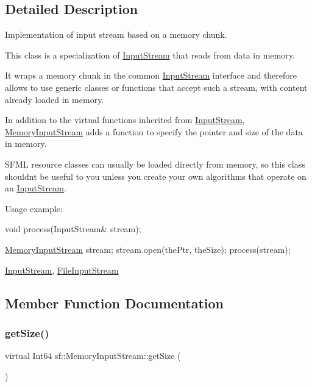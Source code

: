 \subsection{Detailed Description}
Implementation of input stream based on a memory chunk. 

This class is a specialization of \hyperlink{classsf_1_1_input_stream}{Input\+Stream} that reads from data in memory.

It wraps a memory chunk in the common \hyperlink{classsf_1_1_input_stream}{Input\+Stream} interface and therefore allows to use generic classes or functions that accept such a stream, with content already loaded in memory.

In addition to the virtual functions inherited from \hyperlink{classsf_1_1_input_stream}{Input\+Stream}, \hyperlink{classsf_1_1_memory_input_stream}{Memory\+Input\+Stream} adds a function to specify the pointer and size of the data in memory.

S\+F\+ML resource classes can usually be loaded directly from memory, so this class shouldn\textquotesingle{}t be useful to you unless you create your own algorithms that operate on an \hyperlink{classsf_1_1_input_stream}{Input\+Stream}.

Usage example\+: 
\begin{DoxyCode}
\textcolor{keywordtype}{void} process(InputStream& stream);

\hyperlink{classsf_1_1_memory_input_stream_a2d78851a69a8956a79872be41bcdfe0e}{MemoryInputStream} stream;
stream.open(thePtr, theSize);
process(stream);
\end{DoxyCode}


\hyperlink{classsf_1_1_input_stream}{Input\+Stream}, \hyperlink{classsf_1_1_file_input_stream}{File\+Input\+Stream} 

\subsection{Member Function Documentation}
\mbox{\label{classsf_1_1_memory_input_stream_a6ade3ca45de361ffa0a718595f0b6763}} 
\subsubsection{\texorpdfstring{get\+Size()}{getSize()}}
{\footnotesize\ttfamily virtual Int64 sf\+::\+Memory\+Input\+Stream\+::get\+Size (\begin{DoxyParamCaption}{ }\end{DoxyParamCaption})\hspace{0.3cm}{\ttfamily [virtual]}}



